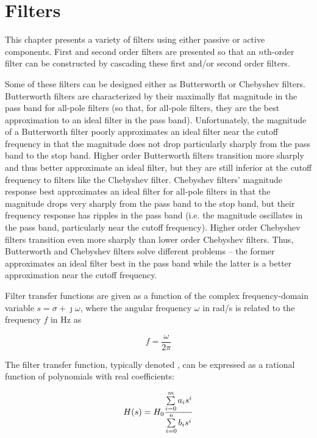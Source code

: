 \chapter{Filters}
This chapter presents a variety of filters using either passive or active components.
First and second order filters are presented so that an $n$th-order filter can be constructed by cascading these first and/or second order filters.

Some of these filters can be designed either as Butterworth or Chebyshev filters.
Butterworth filters are characterized by their maximally flat magnitude in the pass band for all-pole filters (so that, for all-pole filters, they are the best approximation to an ideal filter in the pass band).
Unfortunately, the magnitude of a Butterworth filter poorly approximates an ideal filter near the cutoff frequency in that the magnitude does not drop particularly sharply from the pass band to the stop band.
Higher order Butterworth filters transition more sharply and thus better approximate an ideal filter, but they are still inferior at the cutoff frequency to filters like the Chebyshev filter.
Chebyshev filters' magnitude response best approximates an ideal filter for all-pole filters in that the magnitude drops very sharply from the pass band to the stop band, but their frequency response has ripples in the pass band (i.e. the magnitude oscillates in the pass band, particularly near the cutoff frequency).
Higher order Chebyshev filters transition even more sharply than lower order Chebyshev filters.
Thus, Butterworth and Chebyshev filters solve different problems -- the former approximates an ideal filter best in the pass band while the latter is a better approximation near the cutoff frequency. \autocite[107, 111]{op-amp-circuits-johnson}

Filter transfer functions are given as a function of the complex frequency-domain variable \(s = \sigma + \jmath\omega\), where the angular frequency \(\omega\) in \si{\radian/\second} is related to the frequency \(f\) in \si{\Hz} as

\begin{equation}
	f = \frac{\omega}{2\pi}
	\label{eq:omega_to_f}
\end{equation}

The filter transfer function, typically denoted \Hs, can be expressed as a rational function of polynomials with real coefficients:

\begin{equation}
	H(s) = H_0\frac{\sum\limits_{i=0}^{m} a_i s^i}{\sum\limits_{i=0}^n b_i s^i}
	\label{eq:general_filter_TF}
\end{equation}

